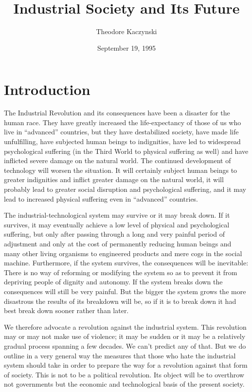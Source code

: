 \documentclass{article}
\title{Industrial Society and Its Future}
\author{Theodore Kaczynski}
\date{September 19, 1995}
\begin{document}
\section{Introduction}
The Industrial Revolution and its consequences have been a disaster for the human race.  They 
have  greatly  increased  the  life-expectancy  of  those  of  us  who  live  in  “advanced”  countries,  but  
they  have  destabilized  society,  have  made  life  unfulfilling,  have  subjected  human  beings  to  
indignities,  have  led  to  widespread  psychological  suffering  (in  the  Third  World  to  physical  
suffering  as  well)  and  have  inflicted  severe  damage  on  the  natural  world.   The  continued  
development  of  technology  will  worsen  the  situation.   It  will  certainly  subject  human  beings  to 
greater indignities and inflict greater damage on the natural world, it will probably lead to greater 
social disruption and psychological suffering, and it may lead to increased physical suffering even 
in “advanced” countries. 

The industrial-technological system may survive or it may break down.  If it survives, it may 
eventually  achieve  a  low  level  of  physical  and  psychological  suffering,  but  only  after  passing  
through a long and very painful period of adjustment and only at the cost of permanently reducing 
human beings and many other living organisms to engineered products and mere cogs in the social 
machine.   Furthermore,  if  the  system  survives,  the  consequences  will  be  inevitable:  There  is  no  
way of reforming or modifying the system so as to prevent it from depriving people of dignity and 
autonomy. If the system breaks down the consequences will still be very painful.  But the bigger the system 
grows the more disastrous the results of its breakdown will be, so if it is to break down it had best 
break down sooner rather than later. 

We therefore advocate a revolution against the industrial system.  This revolution may or may 
not make use of violence; it may be sudden or it may be a relatively gradual process spanning a 
few decades.  We can’t predict any of that.  But we do outline in a very general way the measures 
that those who hate the industrial system should take in order to prepare the way for a revolution 
against that form of society.  This is not to be a political revolution.  Its object will be to overthrow 
not governments but the economic and technological basis of the present society. 
\end{document}
